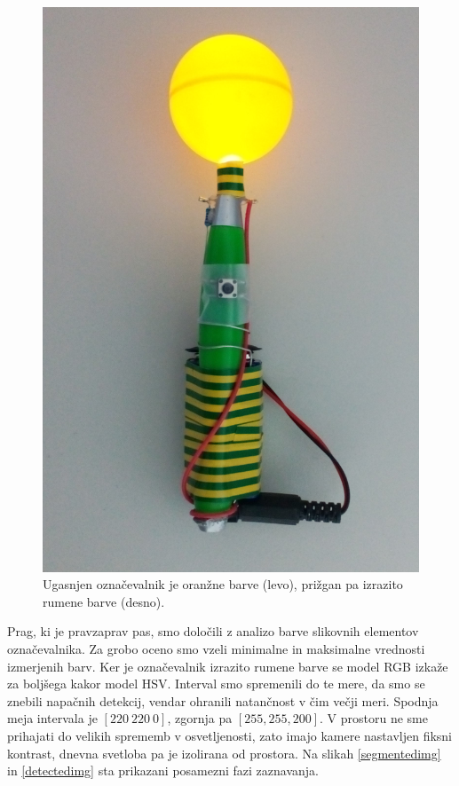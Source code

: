 \documentclass[a4paper, 12pt]{book}
\begin{document}
\begin{figure}[H]
\includegraphics[scale=0.4]{marker_on.png}
\caption{Ugasnjen označevalnik je oranžne barve (levo), prižgan pa izrazito rumene barve (desno).}
\label{markerimg}
\end{figure}

Prag, ki je pravzaprav pas, smo določili z analizo barve slikovnih elementov označevalnika. Za grobo oceno smo vzeli minimalne in maksimalne vrednosti izmerjenih barv. Ker je označevalnik izrazito rumene barve se model RGB izkaže za boljšega kakor model HSV. Interval smo spremenili do te mere, da smo se znebili napačnih detekcij, vendar ohranili natančnost v čim večji meri. Spodnja meja intervala je $[220 \ 220 \ 0]$, zgornja pa $[255, 255, 200]$. V prostoru ne sme prihajati do velikih sprememb v osvetljenosti, zato imajo kamere nastavljen fiksni kontrast, dnevna svetloba pa je izolirana od prostora. Na slikah \ref{segmentedimg} in \ref{detectedimg} sta prikazani posamezni fazi zaznavanja.
\end{document}
